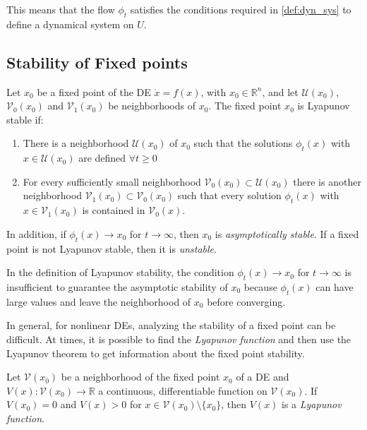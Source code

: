 This means that the flow $\phi_t$ satisfies the conditions required in \ref{def:dyn_sys} to define a dynamical system on $U$.

\subsection{Stability of Fixed points}

\begin{definition}
    Let $x_0$ be a fixed point of the DE $\dot{x} = f(x)$, with $x_0 \in \mathbb{R}^n$, and let $\mathcal{U}(x_0)$, $\mathcal{V}_0(x_0)$ and $\mathcal{V}_1(x_0)$ 
    be neighborhoods of $x_0$. The fixed point $x_0$ is Lyapunov stable if:

    \begin{enumerate}
        \item There is a neighborhood $\mathcal{U}(x_0)$ of $x_0$ such that the solutions $\phi_t(x)$ with $x\in \mathcal{U}(x_0)$ are defined $\forall t \geq 0$
        \item For every sufficiently small neighborhood $\mathcal{V}_0(x_0) \subset \mathcal{U}(x_0)$ there is another neighborhood 
              $\mathcal{V}_1(x_0) \subset \mathcal{V}_0(x_0)$ such that every solution $\phi_t(x)$ with $x\in \mathcal{V}_1(x_0)$ is contained in $\mathcal{V}_0(x)$.
    \end{enumerate}
    In addition, if $\phi_t(x) \rightarrow x_0$ for $t \rightarrow \infty$, then $x_0$ is \textit{asymptotically stable}. If a fixed point is not Lyapunov stable,
    then it is \textit{unstable}.
\end{definition}
In the definition of Lyapunov stability, the condition $\phi_t(x)\rightarrow x_0$ for $t\rightarrow \infty$ is insufficient to guarantee the asymptotic stability of $x_0$
because $\phi_t(x)$ can have large values and leave the neighborhood of $x_0$ before converging.

In general, for nonlinear DEs, analyzing the stability of a fixed point can be difficult. At times, it is possible to find the \textit{Lyapunov function} and then 
use the Lyapunov theorem to get information about the fixed point stability.

\begin{definition}
    Let $\mathcal{V}(x_0)$ be a neighborhood of the fixed point $x_0$ of a DE and $V(x): \mathcal{V}(x_0) \rightarrow \mathbb{R}$ a continuous, differentiable function
    on $\mathcal{V}(x_0)$. If $V(x_0)=0$ and $V(x)>0$ for $x \in \mathcal{V}(x_0) \setminus \{x_0\}$, then $V(x)$ is a \textit{Lyapunov function}.
\end{definition}

